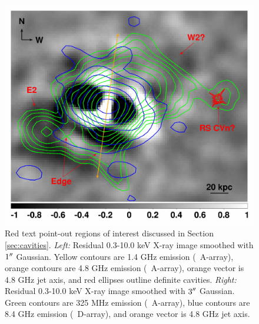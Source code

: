 \begin{figure}
\begin{center}
\begin{minipage}{0.495\linewidth}
      \includegraphics*[width=\textwidth, trim=0mm 0mm 0mm 0mm, clip]{arx_sub_outer.ps}
    \end{minipage}
    \caption{Red text point-out regions of interest discussed in
      Section \ref{sec:cavities}. {\it{Left:}} Residual 0.3-10.0 keV
      X-ray image smoothed with $1\rm{^\prime}\hskip -0.1em\rm{^\prime}$ Gaussian. Yellow contours are
      1.4 GHz emission (\vla\ A-array), orange contours are 4.8 GHz
      emission (\vla\ A-array), orange vector is 4.8 GHz jet axis, and
      red ellipses outline definite cavities. {\it{Right:}} Residual
      0.3-10.0 keV X-ray image smoothed with $3\rm{^\prime}\hskip -0.1em\rm{^\prime}$ Gaussian. Green
      contours are 325 MHz emission (\vla\ A-array), blue contours are
      8.4 GHz emission (\vla\ D-array), and orange vector is 4.8 GHz
      jet axis.}
    \label{fig:subxray}
  \end{center}
\end{figure}

